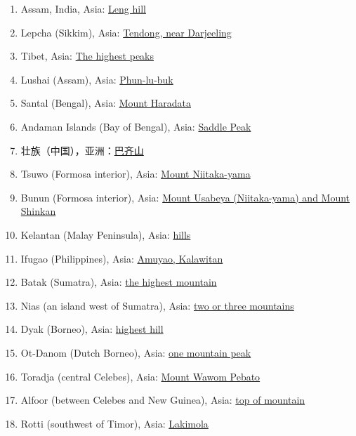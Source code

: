 \documentclass[10pt,twocolumn,letterpaper]{article}
\begin{document}
\begin{flushleft}
\begin{enumerate}
\item Assam, India, Asia: \href{http://www.talkorigins.org/faqs/flood-myths.html#Assam}{Leng hill}
\item Lepcha (Sikkim), Asia: \href{http://www.talkorigins.org/faqs/flood-myths.html#Lepcha}{Tendong, near Darjeeling}
\item Tibet, Asia: \href{http://www.talkorigins.org/faqs/flood-myths.html#Tibet}{The highest peaks}
\item Lushai (Assam), Asia: \href{http://www.talkorigins.org/faqs/flood-myths.html#Lushai}{Phun-lu-buk}
\item Santal (Bengal), Asia: \href{http://www.talkorigins.org/faqs/flood-myths.html#Santal}{Mount Haradata}
\item Andaman Islands (Bay of Bengal), Asia: \href{http://www.talkorigins.org/faqs/flood-myths.html#AndamanIs}{Saddle Peak}
\item 壮族（中国），亚洲：\href{http://www.talkorigins.org/faqs/flood-myths.html#Zhuang}{巴齐山}
\item Tsuwo (Formosa interior), Asia: \href{http://www.talkorigins.org/faqs/flood-myths.html#Tsuwo}{Mount Niitaka-yama}
\item Bunun (Formosa interior), Asia: \href{http://www.talkorigins.org/faqs/flood-myths.html#Bunun}{Mount Usabeya (Niitaka-yama) and Mount Shinkan}
\item Kelantan (Malay Peninsula), Asia: \href{http://www.talkorigins.org/faqs/flood-myths.html#Kelantan}{hills}
\item Ifugao (Philippines), Asia: \href{http://www.talkorigins.org/faqs/flood-myths.html#Ifugao}{Amuyao, Kalawitan}
\item Batak (Sumatra), Asia: \href{http://www.talkorigins.org/faqs/flood-myths.html#Batak}{the highest mountain}
\item Nias (an island west of Sumatra), Asia: \href{http://www.talkorigins.org/faqs/flood-myths.html#Nias}{two or three mountains}
\item Dyak (Borneo), Asia: \href{http://www.talkorigins.org/faqs/flood-myths.html#Dyak}{highest hill}
\item Ot-Danom (Dutch Borneo), Asia: \href{http://www.talkorigins.org/faqs/flood-myths.html#OtDanom}{one mountain peak}
\item Toradja (central Celebes), Asia: \href{http://www.talkorigins.org/faqs/flood-myths.html#Toradja}{Mount Wawom Pebato}
\item Alfoor (between Celebes and New Guinea), Asia: \href{http://www.talkorigins.org/faqs/flood-myths.html#Alfoor}{top of mountain}
\item Rotti (southwest of Timor), Asia: \href{http://www.talkorigins.org/faqs/flood-myths.html#Rotti}{Lakimola}
\end{enumerate}
\end{flushleft}
\end{document}
